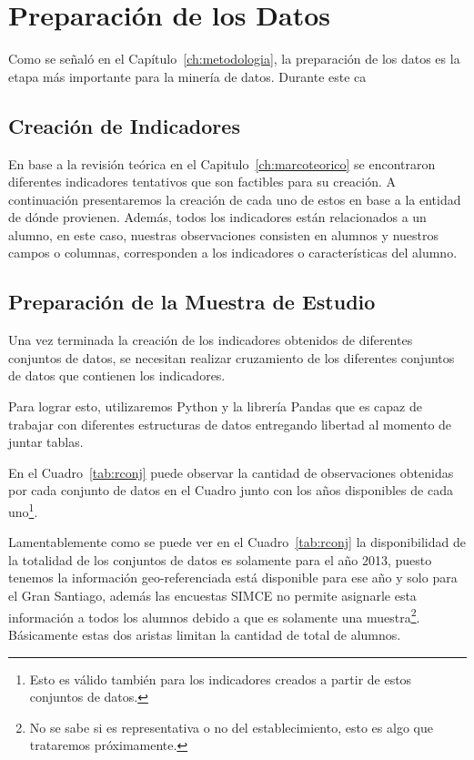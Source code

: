 \section{Preparación de los Datos}
Como se señaló en el Capítulo~\ref{ch:metodologia}, la preparación de los datos es la etapa más importante para la minería de datos. Durante este ca
\subsection{Creación de Indicadores}
En base a la revisión teórica en el Capitulo~\ref{ch:marcoteorico} se encontraron diferentes indicadores tentativos que son factibles para su creación.
A continuación presentaremos la creación de cada uno de estos en base a la entidad de dónde provienen. Además, todos los indicadores están relacionados a un alumno, en este caso, nuestras observaciones consisten en alumnos y nuestros campos o columnas, corresponden a los indicadores o características del alumno.
\subsection{Preparación de la Muestra de Estudio}
Una vez terminada la creación de los indicadores obtenidos de diferentes conjuntos de datos, se necesitan realizar cruzamiento de los diferentes conjuntos de datos que contienen los indicadores.

Para lograr esto, utilizaremos Python y la librería Pandas que es capaz de trabajar con diferentes estructuras de datos entregando libertad al momento de juntar tablas.

En el Cuadro~\ref{tab:rconj} puede observar la cantidad de observaciones obtenidas por cada conjunto de datos en el Cuadro junto con los años disponibles de cada uno\footnote{Esto es válido también para los indicadores creados a partir de estos conjuntos de datos.}.

Lamentablemente como se puede ver en el Cuadro~\ref{tab:rconj} la disponibilidad de la totalidad de los conjuntos de datos es solamente para el año 2013, puesto tenemos la información geo-referenciada está disponible para ese año y solo para el Gran Santiago, además las encuestas SIMCE no permite asignarle esta información a todos los alumnos debido a que es solamente una muestra\footnote{No se sabe si es representativa o no del establecimiento, esto es algo que trataremos próximamente.}. Básicamente estas dos aristas limitan la cantidad de total de alumnos.

